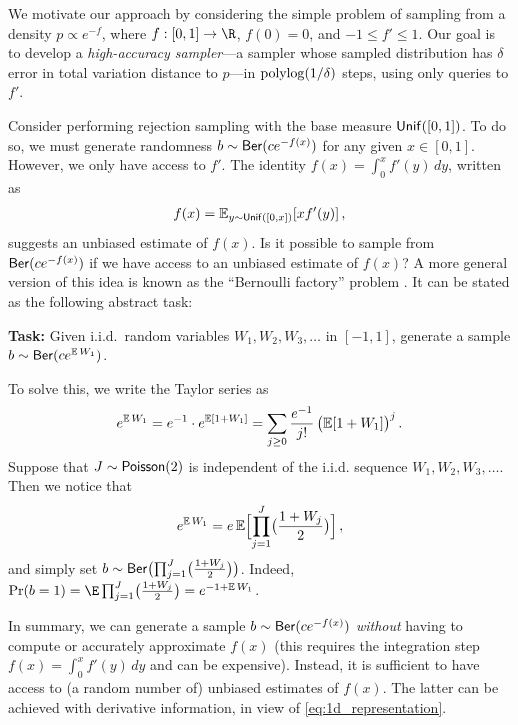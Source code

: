 



We motivate our approach by considering the simple problem of sampling from a density $p\propto e^{-f}$, where $f : [0,1]\to\R$, $f(0) = 0$, and $-1 \le f' \le 1$.
Our goal is to develop a \emph{high-accuracy sampler}---a sampler whose sampled distribution has $\delta$ error in total variation distance to $p$---in $\polylog(1/\delta)$ steps, using only queries to $f'$.

Consider performing rejection sampling with the base measure $\unif([0,1])$. To do so, we must generate randomness $b\sim \Ber(ce^{-f(x)})$ for any given $x\in[0,1]$. However, we only have access to $f'$. The identity $f(x)=\int_{0}^x f'(y)\,dy$, written as
\begin{align}
\label{eq:1d_representation}
    f(x)=\En_{y\sim \unif([0,x])}[xf'(y)]\,,
\end{align}
suggests an unbiased estimate of $f(x)$. Is it possible to sample from $\Ber(ce^{-f(x)})$ if we have access to an unbiased estimate of $f(x)$?
A more general version of this idea is known as the ``Bernoulli factory'' problem \citep{keane1994bernoulli,nacu2005fast}. 
It can be stated as the following abstract task:
\begin{center}
    \textbf{Task:} Given i.i.d.\ random variables $W_1,W_2,W_3,\dotsc$ in $[-1,1]$, generate a sample $b\sim \Ber(ce^{\En W_1})$.
\end{center}
To solve this, we write the Taylor series as
\begin{align}\notag
    e^{\En W_1}=e^{-1}\cdot e^{\En[1+W_1]}
    =\sum_{j\geq 0} \frac{e^{-1}}{j!}\, \bigl(\En[1+W_1]\bigr)^j\,.
\end{align}
Suppose that $J\sim \Poi(2)$ is independent of the i.i.d. sequence $W_1,W_2,W_3,\dotsc$. Then we notice that
\begin{align}\notag
    e^{\En W_1}=e\En\brk[\Big]{\prod_{j=1}^J \bigl(\frac{1+W_j}{2}\bigr)}\,,
\end{align}
and simply set $b\sim \Ber\prn[\big]{\prod_{j=1}^J \bigl(\frac{1+W_j}{2}\bigr)}$.
Indeed, $\Pr(b=1) = \E\prod_{j=1}^J \bigl(\frac{1+W_j}{2}\bigr) = e^{-1+\En W_1}$.

In summary, we can generate a sample $b\sim \Ber\prn{ce^{-f(x)}}$ \emph{without} having to compute or accurately approximate $f(x)$ (this requires the integration step $f(x)=\int_{0}^x f'(y)\,dy$ and can be expensive). Instead, it is sufficient to have access to (a random number of) unbiased estimates of $f(x)$. The latter can be achieved with derivative information, in view of \eqref{eq:1d_representation}.

